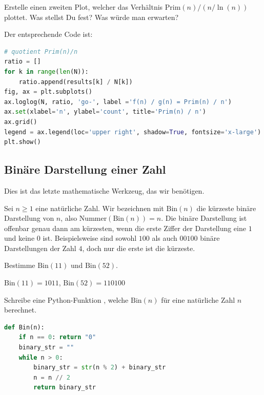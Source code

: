 \begin{myexercise}
	Erstelle einen zweiten Plot, welcher das Verhältnis $\text{Prim}(n) / (n / \ln{(n)})$ plottet. Was stellst Du fest? Was würde man erwarten?
	\begin{myanswer}
		Der entsprechende Code ist:
		\begin{lstlisting}[language=Python,numbers=none]
# quotient Prim(n)/n
ratio = []
for k in range(len(N)):
    ratio.append(results[k] / N[k])
fig, ax = plt.subplots()
ax.loglog(N, ratio, 'go-', label ='f(n) / g(n) = Prim(n) / n')
ax.set(xlabel='n', ylabel='count', title='Prim(n) / n')
ax.grid()
legend = ax.legend(loc='upper right', shadow=True, fontsize='x-large')
plt.show()
\end{lstlisting}
	\end{myanswer}
\end{myexercise}

\clearpage

\subsection{Binäre Darstellung einer Zahl}
Dies ist das letzte mathematische Werkzeug, das wir benötigen.

Sei $n\geq 1$ eine natürliche Zahl. Wir bezeichnen mit $\text{Bin}(n)$ die kürzeste binäre Darstellung von $n$, also $\text{Nummer}(\text{Bin}(n)) = n$.
Die binäre Darstellung ist offenbar genau dann am kürzesten, wenn die erste Ziffer der Darstellung eine $1$ und keine $0$ ist.
Beispielsweise sind sowohl $100$ als auch $00100$ binäre Darstellungen der Zahl $4$, doch nur die erste ist die kürzeste.

\begin{myexercise}
	Bestimme $\text{Bin}(11)$ und $\text{Bin}(52)$.
	\begin{myanswer}
		$\text{Bin}(11) = 1011$, $\text{Bin}(52) = 110100$
	\end{myanswer}
\end{myexercise}

\begin{mychallenge}
	Schreibe eine Python-Funktion , welche $\text{Bin}(n)$ für eine natürliche Zahl $n$ berechnet.
	\begin{myanswer}
		\begin{lstlisting}[language=Python,numbers=none]
def Bin(n):
    if n == 0: return "0"
    binary_str = ""
    while n > 0:
        binary_str = str(n % 2) + binary_str
        n = n // 2
        return binary_str
\end{lstlisting}
	\end{myanswer}
\end{mychallenge}

